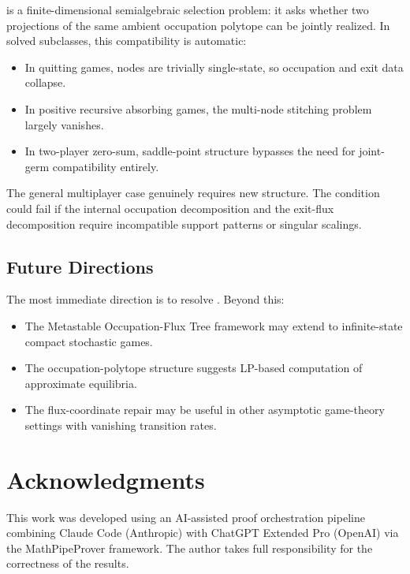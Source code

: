 \documentclass[12pt,a4paper]{article}
\theoremstyle{definition}
\begin{document}
 is a finite-dimensional semialgebraic selection problem: it asks whether two projections of the same ambient occupation polytope can be jointly realized.  In solved subclasses, this compatibility is automatic:
\begin{itemize}
\item In quitting games, nodes are trivially single-state, so occupation and exit data collapse.
\item In positive recursive absorbing games, the multi-node stitching problem largely vanishes.
\item In two-player zero-sum, saddle-point structure bypasses the need for joint-germ compatibility entirely.
\end{itemize}

The general multiplayer case genuinely requires new structure.  The condition could fail if the internal occupation decomposition and the exit-flux decomposition require incompatible support patterns or singular scalings.

\subsection{Future Directions}

The most immediate direction is to resolve .  Beyond this:
\begin{itemize}
\item The Metastable Occupation-Flux Tree framework may extend to infinite-state compact stochastic games.
\item The occupation-polytope structure suggests LP-based computation of approximate equilibria.
\item The flux-coordinate repair may be useful in other asymptotic game-theory settings with vanishing transition rates.
\end{itemize}

\section*{Acknowledgments}

This work was developed using an AI-assisted proof orchestration pipeline combining Claude Code (Anthropic) with ChatGPT Extended Pro (OpenAI) via the MathPipeProver framework.  The author takes full responsibility for the correctness of the results.
\end{document}
